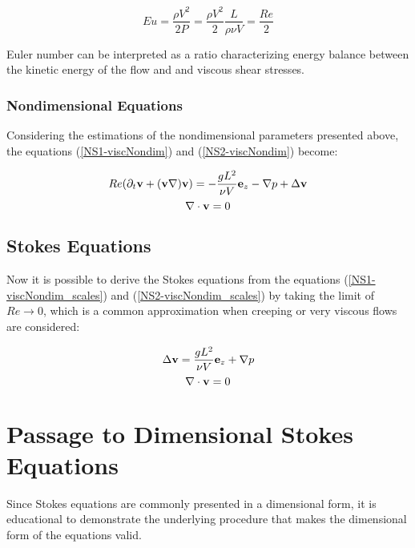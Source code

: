 $$ Eu = \frac{\rho V^2}{2P} = \frac{\rho V^2}{2} \frac{L}{\rho\nu V} = \frac{Re}{2}$$

Euler number can be interpreted as a ratio characterizing energy balance between the kinetic energy of the flow and and viscous shear stresses.

\subsubsection{Nondimensional Equations}

Considering the estimations of the nondimensional parameters presented above, the equations (\ref{NS1-viscNondim}) and (\ref{NS2-viscNondim}) become:


\begin{equation} \label{NS1-viscNondim_scales}
Re(\partial_t\mathbf{v} + (\mathbf{v}\nabla)\mathbf{v}) = -\frac{gL^2}{\nu V} \mathbf{e}_z - \nabla p + \Delta\mathbf{v} 
\end{equation}
\begin{equation} \label{NS2-viscNondim_scales}
\nabla\cdot\mathbf{v} = 0 
\end{equation}

\subsection{Stokes Equations}

Now it is possible to derive the Stokes equations from the equations (\ref{NS1-viscNondim_scales}) and (\ref{NS2-viscNondim_scales}) by taking the limit of $ Re \longrightarrow 0$, which is a common approximation when creeping or very viscous flows are considered:

\begin{equation} \label{NS1-StokesNondim}
\Delta\mathbf{v} = \frac{gL^2}{\nu V} \mathbf{e}_z + \nabla p 
\end{equation}
\begin{equation} \label{NS2-StokesNondim}
\nabla\cdot\mathbf{v} = 0 
\end{equation}

\section{Passage to Dimensional Stokes Equations}

Since Stokes equations are commonly presented in a dimensional form, it is educational to demonstrate the underlying procedure that makes the dimensional form of the equations valid.

